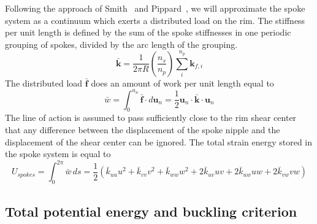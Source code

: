 \documentclass{bmd2016p}
\begin{document}
Following the approach of Smith~\cite{Smith1901a} and Pippard~\cite{Pippard1932d}, we will approximate the spoke system as a continuum which exerts a distributed load on the rim. The stiffness per unit length is defined by the sum of the spoke stiffnesses in one periodic grouping of spokes, divided by the arc length of the grouping.
\begin{equation}\label{eq:kbar}
\bar{\bm{k}} = \frac{1}{2\pi R}\left(\frac{n_s}{n_p}\right) \sum_i^{n_p} \bm{k}_{f, i}
\end{equation}
The distributed load $\bar{\bm{f}}$ does an amount of work per unit length equal to
\begin{equation}\label{eq:w_spokes}
\bar{w} = \int_0^{u_n} \bar{\bm{f}} \cdot d\bm{u}_n = \frac{1}{2} \bm{u}_n \cdot \bar{\bm{k}} \cdot \bm{u}_n
\end{equation}
The line of action is assumed to pass sufficiently close to the rim shear center that any difference between the displacement of the spoke nipple and the displacement of the shear center can be ignored. The total strain energy stored in the spoke system is equal to
\begin{equation}\label{eq:Us}
U_{spokes} = \int_0^{2\pi} \bar{w} \, ds = \frac{1}{2}\left( \bar{k}_{uu}u^2 + \bar{k}_{vv}v^2 + \bar{k}_{ww}w^2 + 2\bar{k}_{uv}uv + 2\bar{k}_{uw}uw + 2\bar{k}_{vw}vw\right)
\end{equation}


\subsection{Total potential energy and buckling criterion}
\end{document}
